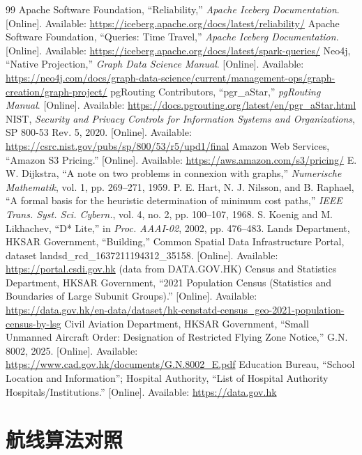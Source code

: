 \documentclass[a4paper,11pt,UTF8]{ctexart}
\begin{document}
\begin{thebibliography}{99}
 Apache Software Foundation, “Reliability,” \emph{Apache Iceberg Documentation}. [Online]. Available: \url{https://iceberg.apache.org/docs/latest/reliability/}
 Apache Software Foundation, “Queries: Time Travel,” \emph{Apache Iceberg Documentation}. [Online]. Available: \url{https://iceberg.apache.org/docs/latest/spark-queries/}
 Neo4j, “Native Projection,” \emph{Graph Data Science Manual}. [Online]. Available: \url{https://neo4j.com/docs/graph-data-science/current/management-ops/graph-creation/graph-project/}
 pgRouting Contributors, “pgr\_aStar,” \emph{pgRouting Manual}. [Online]. Available: \url{https://docs.pgrouting.org/latest/en/pgr_aStar.html}
 NIST, \emph{Security and Privacy Controls for Information Systems and Organizations}, SP 800-53 Rev. 5, 2020. [Online]. Available: \url{https://csrc.nist.gov/pubs/sp/800/53/r5/upd1/final}
 Amazon Web Services, “Amazon S3 Pricing.” [Online]. Available: \url{https://aws.amazon.com/s3/pricing/}
 E. W. Dijkstra, “A note on two problems in connexion with graphs,” \emph{Numerische Mathematik}, vol. 1, pp. 269–271, 1959.
 P. E. Hart, N. J. Nilsson, and B. Raphael, “A formal basis for the heuristic determination of minimum cost paths,” \emph{IEEE Trans. Syst. Sci. Cybern.}, vol. 4, no. 2, pp. 100–107, 1968.
 S. Koenig and M. Likhachev, “D* Lite,” in \emph{Proc. AAAI-02}, 2002, pp. 476–483.
 Lands Department, HKSAR Government, “Building,” Common Spatial Data Infrastructure Portal, dataset landsd\_rcd\_1637211194312\_35158. [Online]. Available: \url{https://portal.csdi.gov.hk} (data from DATA.GOV.HK)
 Census and Statistics Department, HKSAR Government, “2021 Population Census (Statistics and Boundaries of Large Subunit Groups).” [Online]. Available: \url{https://data.gov.hk/en-data/dataset/hk-censtatd-census_geo-2021-population-census-by-lsg}
 Civil Aviation Department, HKSAR Government, “Small Unmanned Aircraft Order: Designation of Restricted Flying Zone Notice,” G.N. 8002, 2025. [Online]. Available: \url{https://www.cad.gov.hk/documents/G.N.8002_E.pdf}
 Education Bureau, “School Location and Information”; Hospital Authority, “List of Hospital Authority Hospitals/Institutions.” [Online]. Available: \url{https://data.gov.hk}
\end{thebibliography}

\appendix
\section{航线算法对照}\label{app:alg}
\end{document}
